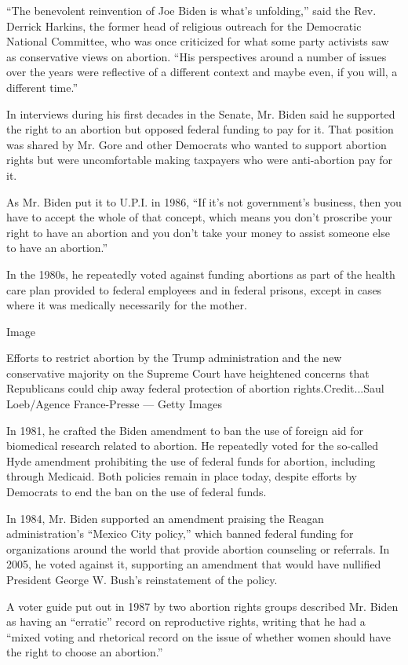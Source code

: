 ``The benevolent reinvention of Joe Biden is what's unfolding,'' said
the Rev. Derrick Harkins, the former head of religious outreach for the
Democratic National Committee, who was once criticized for what some
party activists saw as conservative views on abortion. ``His
perspectives around a number of issues over the years were reflective of
a different context and maybe even, if you will, a different time.''

In interviews during his first decades in the Senate, Mr. Biden said he
supported the right to an abortion but opposed federal funding to pay
for it. That position was shared by Mr. Gore and other Democrats who
wanted to support abortion rights but were uncomfortable making
taxpayers who were anti-abortion pay for it.

As Mr. Biden put it to U.P.I. in 1986, ``If it's not government's
business, then you have to accept the whole of that concept, which means
you don't proscribe your right to have an abortion and you don't take
your money to assist someone else to have an abortion.''

In the 1980s, he repeatedly voted against funding abortions as part of
the health care plan provided to federal employees and in federal
prisons, except in cases where it was medically necessarily for the
mother.

Image

Efforts to restrict abortion by the Trump administration and the new
conservative majority on the Supreme Court have heightened concerns that
Republicans could chip away federal protection of abortion
rights.Credit...Saul Loeb/Agence France-Presse --- Getty Images

In 1981, he crafted the Biden amendment to ban the use of foreign aid
for biomedical research related to abortion. He repeatedly voted for the
so-called Hyde amendment prohibiting the use of federal funds for
abortion, including through Medicaid. Both policies remain in place
today, despite efforts by Democrats to end the ban on the use of federal
funds.

In 1984, Mr. Biden supported an amendment praising the Reagan
administration's ``Mexico City policy,'' which banned federal funding
for organizations around the world that provide abortion counseling or
referrals. In 2005, he voted against it, supporting an amendment that
would have nullified President George W. Bush's reinstatement of the
policy.

A voter guide put out in 1987 by two abortion rights groups described
Mr. Biden as having an ``erratic'' record on reproductive rights,
writing that he had a ``mixed voting and rhetorical record on the issue
of whether women should have the right to choose an abortion.''

